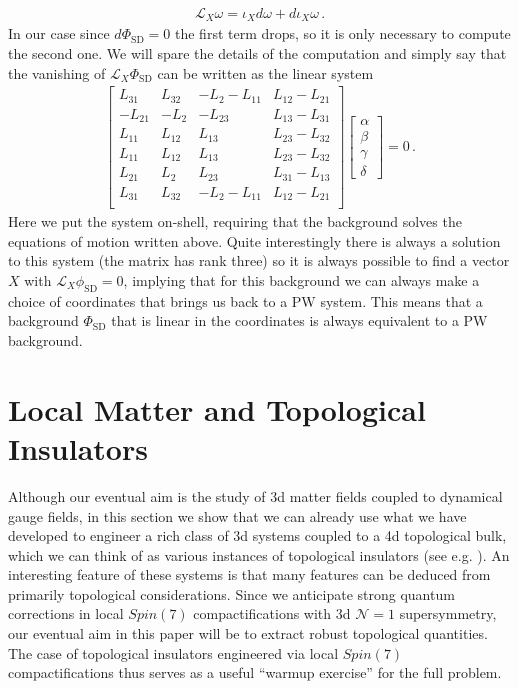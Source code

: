 \documentclass[12pt]{article}%
\numberwithin{equation}{section}
\newcommand{\al}[1]{\begin{align}#1\end{align}}
\renewcommand{\(}{\left(}
\renewcommand{\)}{\right)}
\renewcommand{\[}{\left[}
\renewcommand{\]}{\right]}
\begin{document}
%
\al{ \mathcal L_X \omega = \iota_X d \omega + d \iota_X \omega\,.
}
%
In our case since $d\Phi_{\text{SD}} = 0$ the first term drops, so it is only necessary to compute the second one. We will spare the details of the computation and simply say that the vanishing of $\mathcal L_X \Phi_{\text{SD}} $ can be written as the linear system
%
\al{ \left[
\begin{array}{cccc}
 L_{31} & L_{32} & -L_2-L_{11} & L_{12}-L_{21} \\
 -L_{21} & -L_2 & -L_{23} & L_{13}-L_{31} \\
 L_{11} & L_{12} & L_{13} & L_{23}-L_{32} \\
 L_{11} & L_{12} & L_{13} & L_{23}-L_{32} \\
 L_{21} & L_2 & L_{23} & L_{31}-L_{13} \\
 L_{31} & L_{32} & -L_2-L_{11} & L_{12}-L_{21} \\
\end{array}
\right] \left[\begin{array}{c}\alpha \\ \beta \\ \gamma \\ \delta \end{array}\right] = 0\,.
}
%
Here we put the system on-shell, requiring that the background solves the equations of motion written above. Quite interestingly there is always a solution to this system (the matrix has rank three) so it is always possible to find a vector $X$ with $\mathcal L_X \phi_{\text{SD}} = 0$, implying that for this background we can always make a choice of coordinates that brings us back to a PW system.
This means that a background $\Phi_{\text{SD}}$ that is linear in the coordinates is always equivalent to a PW background.

\section{Local Matter and Topological Insulators} \label{sec:TOPOINS}

Although our eventual aim is the study of 3d matter fields coupled to dynamical gauge fields, in this section we show that
we can already use what we have developed to
engineer a rich class of 3d systems coupled to a 4d topological bulk,
which we can think of as various instances of topological insulators (see e.g. \cite{PhysRevLett.95.226801, PhysRevLett.96.106802, Qi2011}).
An interesting feature of these systems is that many features can be deduced from primarily topological considerations. Since we anticipate strong quantum corrections in local $Spin(7)$ compactifications with 3d $\mathcal{N} = 1$ supersymmetry, our eventual aim in this paper will be to extract robust topological quantities. The case of topological insulators engineered via local $Spin(7)$ compactifications thus serves as a useful ``warmup exercise'' for the full problem.
\end{document}
